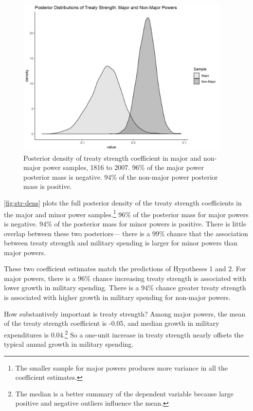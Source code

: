 \documentclass[12pt]{article}
\begin{document}
\begin{figure}[htbp]
	\centering
		\includegraphics[width=0.95\textwidth]{../figures/str-dens.png}
	\caption{Posterior density of treaty strength coefficient in major and non-major power samples, 1816 to 2007. 96\% of the major power posterior mass is negative. 94\% of the non-major power posterior mass is positive.}
	\label{fig:str-dens}
\end{figure}


\autoref{fig:str-dens} plots the full posterior density of the treaty strength coefficients in the major and minor power samples.\footnote{The smaller sample for major powers produces more variance in all the coefficient estimates.} 
96\% of the posterior mass for major powers is negative. 
94\% of the posterior mass for minor powers is positive. 
There is little overlap between these two posteriors--- there is a 99\% chance that the association between treaty strength and military spending is larger for minor powers than major powers. 


These two coefficient estimates match the predictions of Hypotheses 1 and 2. 
For major powers, there is a 96\% chance increasing treaty strength is associated with lower growth in military spending. 
There is a 94\% chance greater treaty strength is associated with higher growth in military spending for non-major powers.


How substantively important is treaty strength? 
Among major powers, the mean of the treaty strength coefficient is -0.05, and median growth in military expenditures is 0.04.\footnote{The median is a better summary of the dependent variable because large positive and negative outliers influence the mean.} 
So a one-unit increase in treaty strength nearly offsets the typical annual growth in military spending. 
\end{document}
